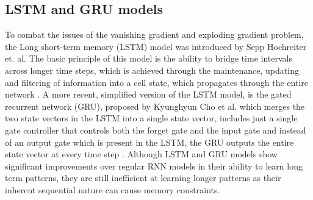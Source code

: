\subsection{LSTM and GRU models}
To combat the issues of the vanishing gradient and exploding gradient problem, the Long short-term memory (LSTM) model was introduced by Sepp Hochreiter et. al. The basic principle of this model is the ability to bridge time intervals across longer time steps, which is achieved through the maintenance, updating and filtering of information into a cell state, which propagates through the entire network \cite{LSTMPaper}. 
A more recent, simplified version of the LSTM model, is the gated recurrent network (GRU), proposed by Kyunghyun Cho et al. which merges the two state vectors in the LSTM into a single state vector, includes just a single gate controller that controls both the forget gate and the input gate and instead of an output gate which is present in the LSTM, the GRU outputs the entire state vector at every time step\cite{RNNPaper} \cite{hands-onML}.
Although LSTM and GRU models show significant improvements over regular RNN models in their ability to learn long term patterns, they are still inefficient at learning longer patterns as their inherent sequential nature can cause memory constraints\cite{AttentionIsAllYouNeed}. 
